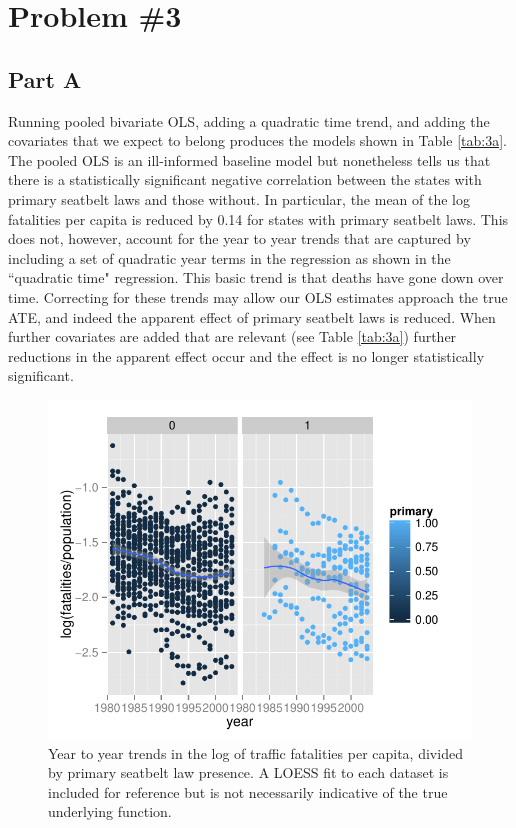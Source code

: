 \documentclass[letterpaper, 12pt]{article}
\begin{document}
\section{Problem \#3}
\subsection{Part A}
Running pooled bivariate OLS, adding a quadratic time trend, and adding the covariates that we expect to belong produces the models shown in Table \ref{tab:3a}.  The pooled OLS is an ill-informed baseline model but nonetheless tells us that there is a statistically significant negative correlation between the states with primary seatbelt laws and those without.  In particular, the mean of the log fatalities per capita is reduced by 0.14 for states with primary seatbelt laws.  This does not, however, account for the year to year trends that are captured by including a set of quadratic year terms in the regression as shown in the ``quadratic time" regression.  This basic trend is that deaths have gone down over time.  Correcting for these trends may allow our OLS estimates approach the true ATE, and indeed the apparent effect of primary seatbelt laws is reduced.  When further covariates are added that are relevant (see Table \ref{tab:3a}) further reductions in the apparent effect occur and the effect is no longer statistically significant.  


\begin{figure}[htbp]
\begin{center}
\includegraphics{plot3a.pdf}
\caption{Year to year trends in the log of traffic fatalities per capita, divided by primary seatbelt law presence.  A LOESS fit to each dataset is included for reference but is not necessarily indicative of the true underlying function.}
\label{fig:3a}
\end{center}
\end{figure}
\end{document}
